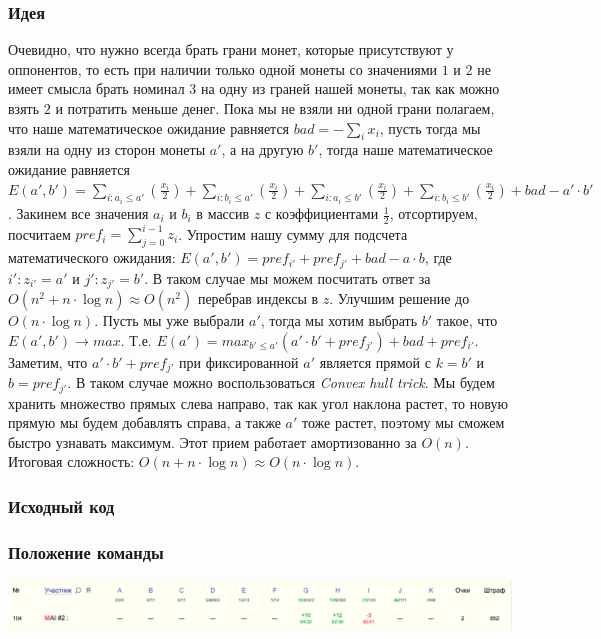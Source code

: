 
\subsubsection*{Идея}
Очевидно, что нужно всегда брать грани монет, которые присутствуют у оппонентов, то есть при наличии только одной монеты со значениями $1$ и $2$ не имеет смысла брать номинал $3$ на одну из граней нашей монеты, так как можно взять $2$ и потратить меньше денег. Пока мы не взяли ни одной грани полагаем, что наше математическое ожидание равняется $bad = -\sum_{i}x_i$, пусть тогда мы взяли на одну из сторон монеты $a'$, а на другую $b'$, тогда наше математическое ожидание равняется $E(a',b') = \sum_{i : a_i \leqslant a'}(\frac{x_i}{2}) + \sum_{i : b_i \leqslant a'}(\frac{x_i}{2}) + \sum_{i : a_i \leqslant b'}(\frac{x_i}{2}) + \sum_{i : b_i \leqslant b'}(\frac{x_i}{2}) + bad - a' \cdot b'$. Закинем все значения $a_i$ и $b_i$ в массив $z$ с коэффициентами $\frac{1}{2}$, отсортируем, посчитаем $pref_i = \sum_{j = 0}^{i - 1}z_i$. Упростим нашу сумму для подсчета математического ожидания: $E(a',b') = pref_{i'} + pref_{j'} + bad - a \cdot b$, где $i' : z_{i'} = a'$ и $j' : z_{j'} = b'$. В таком случае мы можем посчитать ответ за $O(n ^ 2 + n \cdot \log{n}) \approx O(n ^ 2)$ перебрав индексы в $z$. Улучшим решение до $O(n \cdot \log{n})$. Пусть мы уже выбрали $a'$, тогда мы хотим выбрать $b'$ такое, что $E(a', b') \rightarrow max$. Т.е. $E(a') = max_{b' \leqslant a'}(a'\cdot b' + pref_{j'}) + bad + pref_{i'}$. Заметим, что $a'\cdot b' + pref_{j'}$ при фиксированной $a'$ является прямой с $k = b'$ и $b = pref_{j'}$. В таком случае можно воспользоваться \textit{Convex hull trick}. Мы будем хранить множество прямых слева направо, так как угол наклона растет, то новую прямую мы будем добавлять справа, а также $a'$ тоже растет, поэтому мы сможем быстро узнавать максимум. Этот прием работает амортизованно за $O(n)$. Итоговая сложность: $O(n + n \cdot \log{n}) \approx O(n \cdot \log{n})$.
\subsubsection*{Исходный код}

\subsubsection*{Положение команды}
\includegraphics[scale=0.25]{images/gp_dolgop.png}\newline\noindent
\pagebreak

